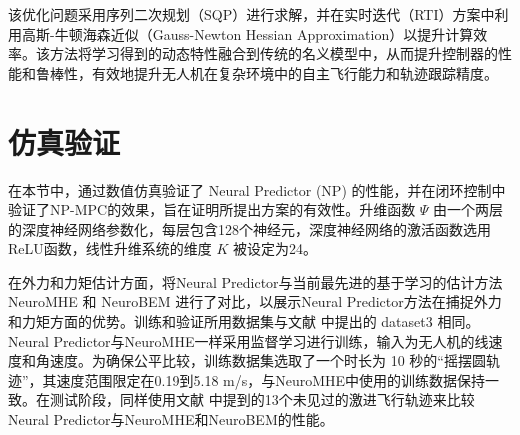 \documentclass[lang=chs, degree=master, blindreview=false, winfonts=true]{yanputhesis}
\begin{document}
该优化问题采用序列二次规划（SQP）进行求解，并在实时迭代（RTI）方案中利用高斯-牛顿海森近似（Gauss-Newton Hessian Approximation）以提升计算效率。该方法将学习得到的动态特性融合到传统的名义模型中，从而提升控制器的性能和鲁棒性，有效地提升无人机在复杂环境中的自主飞行能力和轨迹跟踪精度。

\section{仿真验证}
在本节中，通过数值仿真验证了 Neural Predictor   (NP) 的性能，并在闭环控制中验证了NP-MPC的效果，旨在证明所提出方案的有效性。升维函数 $\Psi$ 由一个两层的深度神经网络参数化，每层包含128个神经元，深度神经网络的激活函数选用ReLU函数，线性升维系统的维度 $K$ 被设定为24。

在外力和力矩估计方面，将Neural Predictor与当前最先进的基于学习的估计方法NeuroMHE \cite{Wang2024e} 和 NeuroBEM \cite{Bauersfeld2021} 进行了对比，以展示Neural Predictor方法在捕捉外力和力矩方面的优势。训练和验证所用数据集与文献  中提出的 dataset3 相同。Neural Predictor与NeuroMHE一样采用监督学习进行训练，输入为无人机的线速度和角速度。为确保公平比较，训练数据集选取了一个时长为 10 秒的“摇摆圆轨迹”，其速度范围限定在0.19到5.18 m/s，与NeuroMHE中使用的训练数据保持一致。在测试阶段，同样使用文献  中提到的13个未见过的激进飞行轨迹来比较Neural Predictor与NeuroMHE和NeuroBEM的性能。
\end{document}
